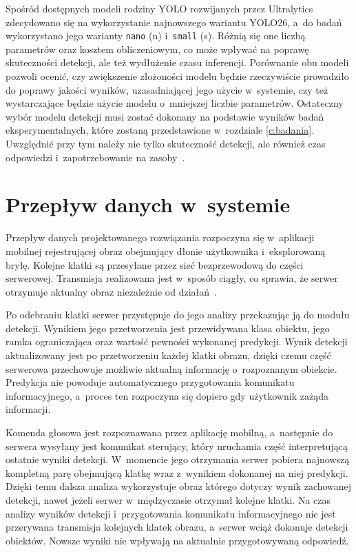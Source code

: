 Spośród dostępnych modeli rodziny YOLO rozwijanych przez Ultralytics zdecydowano się na wykorzystanie najnowszego wariantu YOLO26, a~do badań wykorzystano jego warianty \texttt{nano} (n) i~\texttt{small} (s). Różnią się one liczbą parametrów oraz kosztem obliczeniowym, co może wpływać na poprawę skuteczności detekcji, ale też wydłużenie czasu inferencji. Porównanie obu modeli pozwoli ocenić, czy zwiększenie złożoności modelu będzie rzeczywiście prowadziło do poprawy jakości wyników, uzasadniającej jego użycie w~systemie, czy też wystarczające będzie użycie modelu o~mniejszej liczbie parametrów. Ostateczny wybór modelu detekcji musi zostać dokonany na podstawie wyników badań eksperymentalnych, które zostaną przedstawione w~rozdziale \ref{c:badania}. Uwzględnić przy tym należy nie tylko skuteczność detekcji, ale również czas odpowiedzi i~zapotrzebowanie na zasoby~.

\section{Przepływ danych w~systemie}

Przepływ danych projektowanego rozwiązania rozpoczyna się w~aplikacji mobilnej rejestrującej obraz obejmujący dłonie użytkownika i~eksplorowaną bryłę. Kolejne klatki są przesyłane przez sieć bezprzewodową do części serwerowej. Transmisja realizowana jest w~sposób ciągły, co sprawia, że serwer otrzymuje aktualny obraz niezależnie od działań~.

Po odebraniu klatki serwer przystępuje do jego analizy przekazując ją do modułu detekcji. Wynikiem jego przetworzenia jest przewidywana klasa obiektu, jego ramka ograniczająca oraz wartość pewności wykonanej predykcji. Wynik detekcji aktualizowany jest po przetworzeniu każdej klatki obrazu, dzięki czemu część serwerowa przechowuje możliwie aktualną informację o~rozpoznanym obiekcie. Predykcja nie powoduje automatycznego przygotowania komunikatu informacyjnego, a~proces ten rozpoczyna się dopiero gdy użytkownik zażąda informacji.

Komenda głosowa jest rozpoznawana przez aplikację mobilną, a~następnie do serwera wysyłany jest komunikat sterujący, który uruchamia część interpretującą ostatnie wyniki detekcji. W~momencie jego otrzymania serwer pobiera najnowszą kompletną parę obejmującą klatkę wraz z~wynikiem dokonanej na niej predykcji. Dzięki temu dalsza analiza wykorzystuje obraz którego dotyczy wynik zachowanej detekcji, nawet jeżeli serwer w~międzyczasie otrzymał kolejne klatki. Na czas analizy wyników detekcji i~przygotowania komunikatu informacyjnego nie jest przerywana transmisja kolejnych klatek obrazu, a~serwer wciąż dokonuje detekcji obiektów. Nowsze wyniki nie wpływają na aktualnie przygotowywaną odpowiedź.

